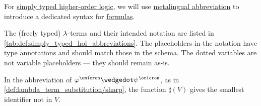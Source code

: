 \begin{definition}\label{def:simply_typed_hol_abbreviations}
  For \hyperref[def:simply_typed_hol]{simply typed higher-order logic}, we will use \hyperref[con:metalingual_abbreviation]{metalingual abbreviation} to introduce a dedicated syntax for \hyperref[def:simply_typed_hol_formula]{formulas}.

  The (freely typed) \( {\mathrm \lambda} \)-terms and their intended notation are listed in \cref{tab:def:simply_typed_hol_abbreviations}. The placeholders in the notation have type annotations and should match those in the schema. The dotted variables are not variable placeholders --- they should remain as-is.

  In the abbreviation of \( \varphi^{\syn\omicron} \synwedge \psi^{\syn\omicron} \), as in \cref{def:lambda_term_substitution/sharp}, the function \( \sharp(V) \) gives the smallest identifier not in \( V \).


\end{definition}
